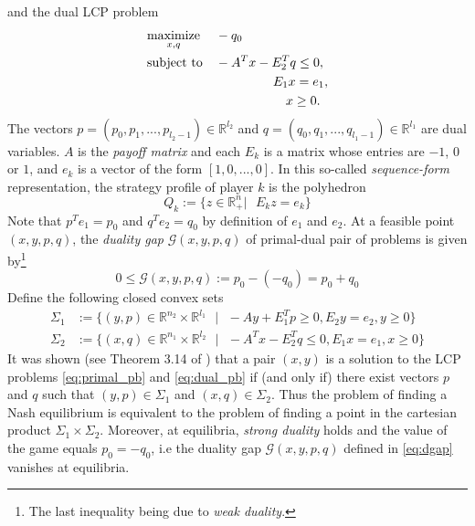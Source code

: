 \documentclass[12pt]{article}
\begin{document}
and the dual LCP problem
\begin{equation}
  \begin{aligned}
    & \underset{x,q}{\text{maximize}}
    && -q_0 \\
    & \text{subject to}
    && -A^Tx - E_2^Tq \leq 0,\\
    &&&\hspace{4.5em} E_1x = e_1,\\
    &&&\hspace{5.5em} x \ge 0.
  \end{aligned}
  \label{eq:dual_pb}
\end{equation}
The vectors $p = (p_0, p_1, ..., p_{l_2 - 1}) \in \mathbb{R}^{l_2}$ and $q = (q_0, q_1, ..., q_{l_1 - 1}) \in \mathbb{R}^{l_1}$ are dual variables. 
$A$ is the \textit{payoff matrix} and each $E_k$ is a matrix whose entries are $-1$, $0$ or $1$, and $e_k$ is a vector of the form $[1, 0, ..., 0]$. In this so-called \textit{sequence-form} representation, the strategy profile of player $k$ is the polyhedron
\begin{equation}
  Q_k := \{z \in \mathbb{R}^n_+ |\text{ }E_kz = e_k\}
\label{eq:polyhedron}
\end{equation}
Note that $p^Te_1 = p_0$ and $q^Te_2 = q_0$ by definition of $e_1$ and $e_2$. At a feasible point $(x, y, p, q)$, the \textit{duality gap} $\mathcal{G}(x, y, p, q)$ of primal-dual pair of problems is given by\footnote{The last inequality being due to \textit{weak duality}.}
\begin{equation}
  0 \le \mathcal{G}(x, y, p, q) := p_0 - (-q_0) = p_0 + q_0
  \label{eq:dgap}
\end{equation}
Define the following closed convex sets
\begin{equation}
  \begin{aligned}
  \Sigma_1 &:= \{(y, p) \in \mathbb{R}^{n_2} \times \mathbb{R}^{l_1}\text{ }|\text{ } -Ay + E_1^Tp \ge 0, E_2y = e_2, y \ge 0\}\\
  \Sigma_2 &:= \{(x, q) \in \mathbb{R}^{n_1} \times \mathbb{R}^{l_2}\text{ }|\text{ } -A^Tx - E_2^Tq \le 0, E_1x = e_1, x \ge 0\}
  \end{aligned}
  \label{eq:feasibility}
\end{equation}
It was shown (see Theorem 3.14 of \cite{vonequilibrium}) that a pair $(x, y)$ is a solution to the LCP problems \eqref{eq:primal_pb} and \eqref{eq:dual_pb} if (and only if) there exist vectors $p$ and $q$ such that $(y, p) \in \Sigma_1$ and $(x, q) \in \Sigma_2$. Thus the problem of finding a Nash equilibrium is equivalent to the problem of finding a point in the cartesian product $\Sigma_1 \times \Sigma_2$. Moreover, at equilibria, \textit{strong duality} holds and the value of the game equals $p_0 = -q_0$, i.e the duality gap $\mathcal{G}(x, y, p, q)$ defined in \eqref{eq:dgap} vanishes at equilibria.
\end{document}
